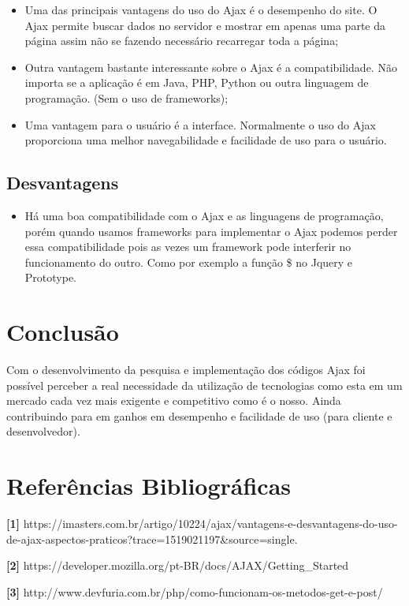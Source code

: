 \documentclass[12pt,a4paper]{article}
\begin{document}
\begin{itemize}
\item Uma das principais vantagens do uso do Ajax é o desempenho do site. O Ajax permite buscar  dados no servidor e mostrar em apenas uma parte da página assim não se fazendo necessário recarregar toda a página;

\item Outra vantagem bastante interessante sobre o Ajax é a compatibilidade. Não importa se a aplicação é em Java, PHP, Python ou outra linguagem de programação. (Sem o uso de frameworks);

\item Uma vantagem para o usuário é a interface. Normalmente o uso do Ajax proporciona uma melhor navegabilidade e facilidade de uso para o usuário.


\end{itemize}

\subsection{Desvantagens}

\begin{itemize}
\item Há uma boa compatibilidade com o Ajax e as linguagens de programação, porém quando usamos frameworks para implementar o Ajax podemos perder essa compatibilidade pois as vezes um framework pode interferir no funcionamento do outro. Como por exemplo a função \$ no Jquery e Prototype.

\end{itemize}

\section{Conclusão}

Com o desenvolvimento da pesquisa e implementação dos códigos Ajax foi possível perceber a real necessidade da utilização de tecnologias como esta em um mercado cada vez mais exigente e competitivo como é o nosso. Ainda contribuindo para em ganhos em desempenho e facilidade de uso (para cliente e desenvolvedor).



\section{Referências Bibliográficas}

\noindent \textbf{[1]} {https://imasters.com.br/artigo/10224/ajax/vantagens-e-desvantagens-do-uso-de-ajax-aspectos-praticos?trace=1519021197\&source=single.}\\\vspace{0.2cm}

\noindent \textbf{[2]} {https://developer.mozilla.org/pt-BR/docs/AJAX/Getting\_Started}\\\vspace{0.2cm}

\noindent \textbf{[3]} {http://www.devfuria.com.br/php/como-funcionam-os-metodos-get-e-post/}\\\vspace{0.2cm}
\end{document}
